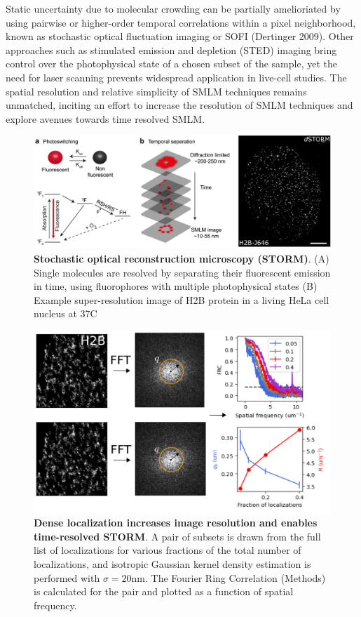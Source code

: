 \documentclass{ucetd}
\begin{document}
Static uncertainty due to molecular crowding can be partially amelioriated by using pairwise or higher-order temporal correlations within a pixel neighborhood, known as stochastic optical fluctuation imaging or SOFI (Dertinger 2009). Other approaches such as stimulated emission and depletion (STED) imaging bring control over the photophysical state of a chosen subset of the sample, yet the need for laser scanning prevents widespread application in live-cell studies. The spatial resolution and relative simplicity of SMLM techniques remains unmatched, inciting an effort to increase the resolution of SMLM techniques and explore avenues towards time resolved SMLM.

\begin{figure}
\includegraphics[width=\textwidth]{Intro.png}
\caption{\textbf{Stochastic optical reconstruction microscopy (STORM)}. (A) Single molecules are resolved by separating their fluorescent emission in time, using fluorophores with multiple photophysical states (B) Example super-resolution image of H2B protein in a living HeLa cell nucleus at 37C}
\end{figure}


\begin{figure}
\begin{center}
\includegraphics[width=13cm]{FRC.png}
\end{center}
\caption{\textbf{Dense localization increases image resolution and enables time-resolved STORM}. A pair of subsets is drawn from the full list of localizations for various fractions of the total number of localizations, and isotropic Gaussian kernel density estimation is performed with $\sigma=20\mathrm{nm}$. The Fourier Ring Correlation (Methods) is calculated for the pair and plotted as a function of spatial frequency.}
\end{figure}
\end{document}

